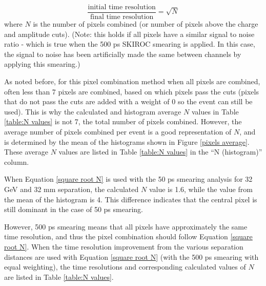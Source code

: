 \documentclass[twocolumn,aps,prd,reprint]{revtex4-1}
\begin{document}
\begin{equation}
\frac{\text{initial time resolution}}{\text{final time resolution}} = \sqrt{N}
\label{square root N}
\end{equation}
where $N$ is the number of pixels combined (or number of pixels above the charge and amplitude cuts). (Note: this holds if all pixels have a similar signal to noise ratio - which is true when the 500 ps SKIROC smearing is applied. In this case, the signal to noise has been artificially made the same between channels by applying this smearing.)

As noted before, for this pixel combination method when all pixels are combined, often less than 7 pixels are combined, based on which pixels pass the cuts (pixels that do not pass the cuts are added with a weight of 0 so the event can still be used). This is why the calculated and histogram average $N$ values in Table \ref{table:N values} is not 7, the total number of pixels combined. However, the average number of pixels combined per event is a good representation of $N$, and is determined by the mean of the histograms shown in Figure \ref{pixels average}. These average $N$ values are listed in Table \ref{table:N values} in the ``N (histogram)'' column.

When Equation \ref{square root N} is used with the 50 ps smearing analysis for 32 GeV and 32 mm separation, the calculated $N$ value is 1.6, while the value from the mean of the histogram is 4. This difference indicates that the central pixel is still dominant in the case of 50 ps smearing.

However, 500 ps smearing means that all pixels have approximately the same time resolution, and thus the pixel combination should follow Equation \ref{square root N}. When the time resolution improvement from the various separation distances are used with Equation \ref{square root N} (with the 500 ps smearing with equal weighting), the time resolutions and corresponding calculated values of $N$ are listed in Table \ref{table:N values}.
\end{document}
